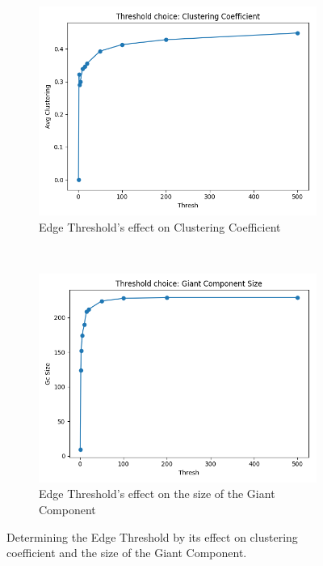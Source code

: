 \begin{figure}[ht]
    \centering
    \begin{subfigure}{0.4\textwidth}
        \includegraphics[width=1.\textwidth]{images/thresh_vs_avg_clustering.png}
        \caption{Edge Threshold's effect on Clustering Coefficient}
    \end{subfigure}
    \\
    \begin{subfigure}{0.4\textwidth}
        \includegraphics[width=1.\textwidth]{images/thresh_vs_gc_size.png}
        \caption{Edge Threshold's effect on the size of the Giant Component}
    \end{subfigure}
    \caption{Determining the Edge Threshold by its effect on clustering coefficient and the size of the Giant Component.}
    \label{fig-threshold-size}
\end{figure}

